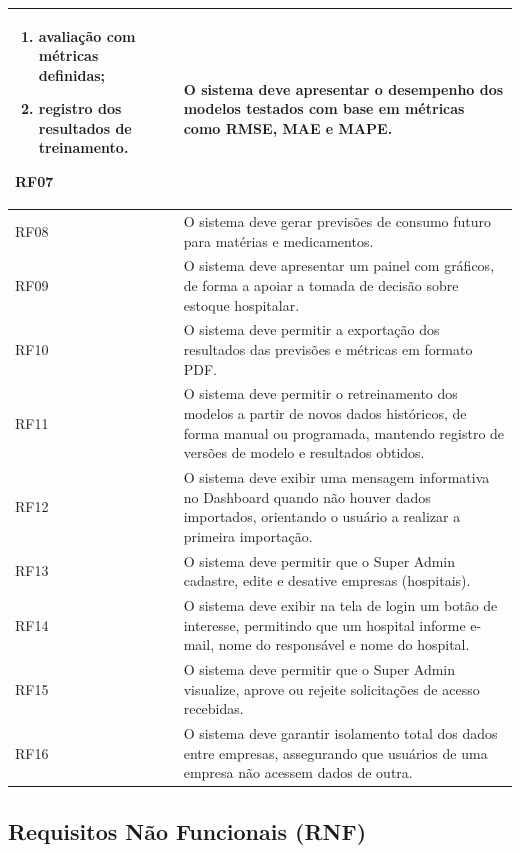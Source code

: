 \documentclass[12pt,a4paper]{article}
\providecommand{\rf}[2]{#1 & #2 \\\midrule}
\begin{document}
\begin{longtable}{p{} p{}}
{\begin{enumerate}[label=\alph*)]
            \item avaliação com métricas definidas;
            \item registro dos resultados de treinamento.
        \end{enumerate}
    }
    \rf{RF07}{O sistema deve apresentar o desempenho dos modelos testados com base em métricas como RMSE, MAE e MAPE.}
    \rf{RF08}{O sistema deve gerar previsões de consumo futuro para matérias e medicamentos.}
    \rf{RF09}{O sistema deve apresentar um painel com gráficos, de forma a apoiar a tomada de decisão sobre estoque hospitalar.}
    \rf{RF10}{O sistema deve permitir a exportação dos resultados das previsões e métricas em formato PDF.}
    \rf{RF11}{O sistema deve permitir o retreinamento dos modelos a partir de novos dados históricos, de forma manual ou programada, mantendo registro de versões de modelo e resultados obtidos.}
    \rf{RF12}{O sistema deve exibir uma mensagem informativa no Dashboard quando não houver dados importados, orientando o usuário a realizar a primeira importação.}
    \rf{RF13}{O sistema deve permitir que o Super Admin cadastre, edite e desative empresas (hospitais).}
    \rf{RF14}{O sistema deve exibir na tela de login um botão de interesse, permitindo que um hospital informe e-mail, nome do responsável e nome do hospital.}
    \rf{RF15}{O sistema deve permitir que o Super Admin visualize, aprove ou rejeite solicitações de acesso recebidas.}
    \rf{RF16}{O sistema deve garantir isolamento total dos dados entre empresas, assegurando que usuários de uma empresa não acessem dados de outra.}
\end{longtable}

\subsection{Requisitos Não Funcionais (RNF)}
\end{document}
